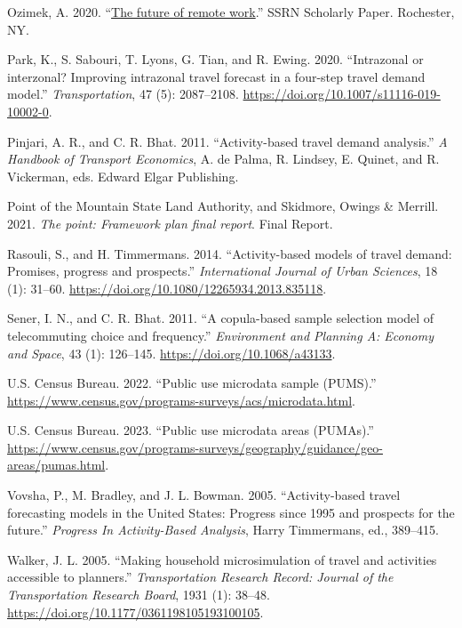 \documentclass[fancy, twoside, mastersfancy, ms]{byuthesis}
\newlength{\cslhangindent}
\newenvironment{CSLReferences}[2] %
 {\begin{list}{}{%
  \setlength{\itemindent}{0pt}
  \setlength{\leftmargin}{0pt}
  \setlength{\parsep}{0pt}
  \ifodd #1
   \setlength{\leftmargin}{\cslhangindent}
   \setlength{\itemindent}{-1\cslhangindent}
  \fi
  \setlength{\itemsep}{#2\baselineskip}}}
 {\end{list}}
\begin{document}
\begin{CSLReferences}{1}{0}
Ozimek, A. 2020. {``\href{https://doi.org/10.2139/ssrn.3638597}{The
future of remote work}.''} {SSRN Scholarly Paper}. Rochester, NY.

Park, K., S. Sabouri, T. Lyons, G. Tian, and R. Ewing. 2020.
{``Intrazonal or interzonal? {Improving} intrazonal travel forecast in a
four-step travel demand model.''} \emph{Transportation}, 47 (5):
2087--2108. \url{https://doi.org/10.1007/s11116-019-10002-0}.

Pinjari, A. R., and C. R. Bhat. 2011. {``Activity-based travel demand
analysis.''} \emph{A {Handbook} of {Transport Economics}}, A. de Palma,
R. Lindsey, E. Quinet, and R. Vickerman, eds. Edward Elgar Publishing.

Point of the Mountain State Land Authority, and Skidmore, Owings \&
Merrill. 2021. \emph{The point: Framework plan final report}. Final
{Report}.

Rasouli, S., and H. Timmermans. 2014. {``Activity-based models of travel
demand: Promises, progress and prospects.''} \emph{International Journal
of Urban Sciences}, 18 (1): 31--60.
\url{https://doi.org/10.1080/12265934.2013.835118}.

Sener, I. N., and C. R. Bhat. 2011. {``A copula-based sample selection
model of telecommuting choice and frequency.''} \emph{Environment and
Planning A: Economy and Space}, 43 (1): 126--145.
\url{https://doi.org/10.1068/a43133}.

U.S. Census Bureau. 2022. {``Public use microdata sample ({PUMS}).''}
\url{https://www.census.gov/programs-surveys/acs/microdata.html}.

U.S. Census Bureau. 2023. {``Public use microdata areas ({PUMAs}).''}
\url{https://www.census.gov/programs-surveys/geography/guidance/geo-areas/pumas.html}.

Vovsha, P., M. Bradley, and J. L. Bowman. 2005. {``Activity-based travel
forecasting models in the {United States}: Progress since 1995 and
prospects for the future.''} \emph{Progress {In Activity-Based
Analysis}}, Harry Timmermans, ed., 389--415.

Walker, J. L. 2005. {``Making household microsimulation of travel and
activities accessible to planners.''} \emph{Transportation Research
Record: Journal of the Transportation Research Board}, 1931 (1): 38--48.
\url{https://doi.org/10.1177/0361198105193100105}.


\end{CSLReferences}
\end{document}
